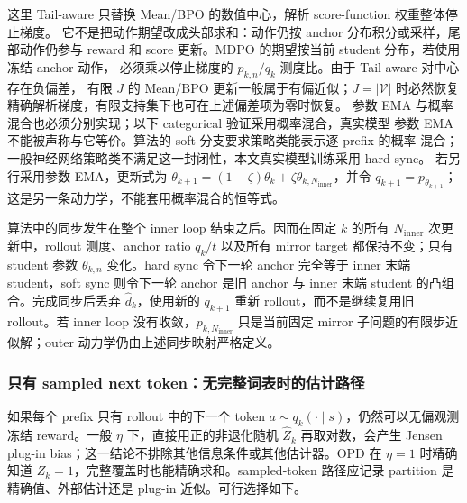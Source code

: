 \documentclass[lang=cn,scheme=chinese,openany]{../book/elegantbook}
\begin{document}
这里 Tail-aware 只替换 Mean/BPO 的数值中心，解析 score-function 权重整体停止梯度。 它不是把动作期望改成头部求和：动作仍按 anchor 分布积分或采样，尾部动作仍参与 reward 和 score 更新。MDPO 的期望按当前 student 分布，若使用冻结 anchor 动作， 必须乘以停止梯度的 $p_{k,n}/q_k$ 测度比。由于 Tail-aware 对中心存在负偏差， 有限 $J$ 的 Mean/BPO 更新一般属于有偏近似；$J=|\mathcal V|$ 时必然恢复精确解析梯度，有限支持集下也可在上述偏差项为零时恢复。 参数 EMA 与概率混合也必须分别实现；以下 categorical 验证采用概率混合，真实模型 参数 EMA 不能被声称与它等价。算法的 soft 分支要求策略类能表示逐 prefix 的概率 混合；一般神经网络策略类不满足这一封闭性，本文真实模型训练采用 hard sync。 若另行采用参数 EMA，更新式为 $\theta_{k+1}=(1-\zeta)\theta_k+\zeta\theta_{k,N_{\mathrm{inner}}}$，并令 $q_{k+1}=p_{\theta_{k+1}}$；这是另一条动力学，不能套用概率混合的恒等式。

算法中的同步发生在整个 inner loop 结束之后。因而在固定 $k$ 的所有 $N_{\mathrm{inner}}$ 次更新中，rollout 测度、anchor ratio $q_k/t$ 以及所有 mirror target 都保持不变；只有 student 参数 $\theta_{k,n}$ 变化。hard sync 令下一轮 anchor 完全等于 inner 末端 student，soft sync 则令下一轮 anchor 是旧 anchor 与 inner 末端 student 的凸组合。完成同步后丢弃 $\widehat d_k$，使用新的 $q_{k+1}$ 重新 rollout，而不是继续复用旧 rollout。若 inner loop 没有收敛，$p_{k,N_{\mathrm{inner}}}$ 只是当前固定 mirror 子问题的有限步近似解；outer 动力学仍由上述同步映射严格定义。

\subsubsection*{只有 sampled next token：无完整词表时的估计路径}

如果每个 prefix 只有 rollout 中的下一个 token $a\sim q_k(\cdot\mid s)$，仍然可以无偏观测冻结 reward。一般 $\eta$ 下，直接用正的非退化随机 $\widehat Z_k$ 再取对数，会产生 Jensen plug-in bias；这一结论不排除其他信息条件或其他估计器。OPD 在 $\eta=1$ 时精确知道 $Z_k=1$，完整覆盖时也能精确求和。sampled-token 路径应记录 partition 是精确值、外部估计还是 plug-in 近似。可行选择如下。
\end{document}
